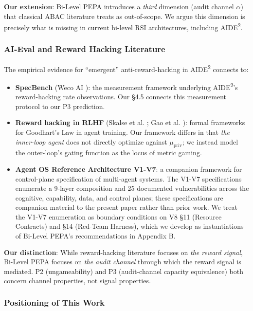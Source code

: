 \documentclass{article}
\theoremstyle{definition}
\begin{document}
\textbf{Our extension}: Bi-Level PEPA introduces a \emph{third} dimension (audit channel $\alpha$) that classical ABAC literature treats as out-of-scope. We argue this dimension is precisely what is missing in current bi-level RSI architectures, including AIDE\textsuperscript{2}.

\subsubsection{AI-Eval and Reward Hacking Literature}

The empirical evidence for ``emergent'' anti-reward-hacking in AIDE\textsuperscript{2} connects to:
\begin{itemize}
    \item \textbf{SpecBench} (Weco AI \cite{weco2024specbench}): the measurement framework underlying AIDE\textsuperscript{2}'s reward-hacking rate observations. Our \S4.5 connects this measurement protocol to our P3 prediction.
    \item \textbf{Reward hacking in RLHF} (Skalse et al. \cite{skalse2022rewardhacking}; Gao et al. \cite{gao2023rewardhackingllms}): formal frameworks for Goodhart's Law in agent training. Our framework differs in that \emph{the inner-loop agent} does not directly optimize against $\mu_{\text{priv}}$; we instead model the outer-loop's gating function as the locus of metric gaming.
    \item \textbf{Agent OS Reference Architecture V1-V7}: a companion framework for control-plane specification of multi-agent systems. The V1-V7 specifications enumerate a 9-layer composition and 25 documented vulnerabilities across the cognitive, capability, data, and control planes; these specifications are companion material to the present paper rather than prior work. We treat the V1-V7 enumeration as boundary conditions on V8 \S11 (Resource Contracts) and \S14 (Red-Team Harness), which we develop as instantiations of Bi-Level PEPA's recommendations in Appendix B.
\end{itemize}

\textbf{Our distinction}: While reward-hacking literature focuses on \emph{the reward signal}, Bi-Level PEPA focuses on \emph{the audit channel} through which the reward signal is mediated. P2 (ungameability) and P3 (audit-channel capacity equivalence) both concern channel properties, not signal properties.

\subsubsection{Positioning of This Work}
\end{document}
